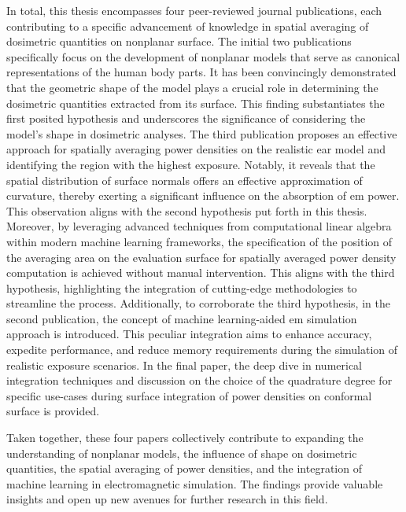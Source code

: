 In total, this thesis encompasses four peer-reviewed journal publications, each contributing to a specific advancement of knowledge in spatial averaging of dosimetric quantities on nonplanar surface.
The initial two publications specifically focus on the development of nonplanar models that serve as canonical representations of the human body parts.
It has been convincingly demonstrated that the geometric shape of the model plays a crucial role in determining the dosimetric quantities extracted from its surface.
This finding substantiates the first posited hypothesis and underscores the significance of considering the model's shape in dosimetric analyses.
The third publication proposes an effective approach for spatially averaging power densities on the realistic ear model and identifying the region with the highest exposure.
Notably, it reveals that the spatial distribution of surface normals offers an effective approximation of curvature, thereby exerting a significant influence on the absorption of \gls{em} power.
This observation aligns with the second hypothesis put forth in this thesis.
Moreover, by leveraging advanced techniques from computational linear algebra within modern machine learning frameworks, the specification of the position of the averaging area on the evaluation surface for spatially averaged power density computation is achieved without manual intervention.
This aligns with the third hypothesis, highlighting the integration of cutting-edge methodologies to streamline the process.
Additionally, to corroborate the third hypothesis, in the second publication, the concept of machine learning-aided \gls{em} simulation approach is introduced.
This peculiar integration aims to enhance accuracy, expedite performance, and reduce memory requirements during the simulation of realistic exposure scenarios.
In the final paper, the deep dive in numerical integration techniques and discussion on the choice of the quadrature degree for specific use-cases during surface integration of power densities on conformal surface is provided.

Taken together, these four papers collectively contribute to expanding the understanding of nonplanar models, the influence of shape on dosimetric quantities, the spatial averaging of power densities, and the integration of machine learning in electromagnetic simulation.
The findings provide valuable insights and open up new avenues for further research in this field.
